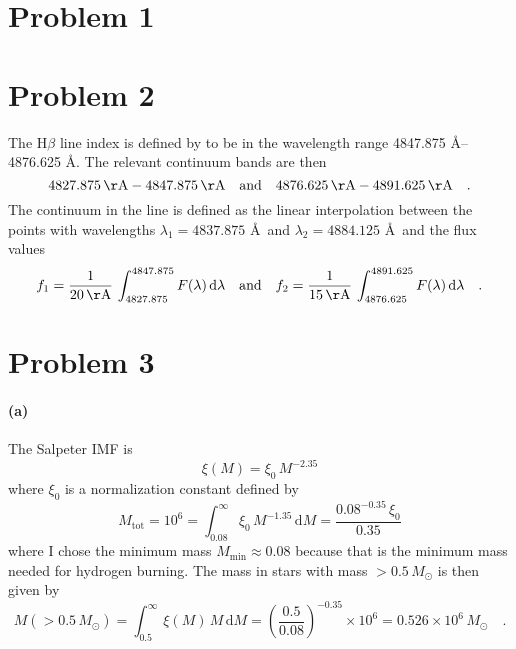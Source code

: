 \documentclass[11pt]{article}
\newcommand{\sun}{\odot}
\newcommand{\dd}{\ensuremath{\,\mathrm{d}}}
\begin{document}
\section*{Problem 1}

\section*{Problem 2}

The H$\beta$ line index is defined by \citet{worthey} to be in the wavelength
range 4847.875 \AA--4876.625 \AA. The relevant continuum bands are then
\begin{equation}
    4827.875 \, \mathrm{\AA}-4847.875\,\mathrm{\AA} \quad \mathrm{and} \quad
    4876.625 \, \mathrm{\AA}-4891.625\, \mathrm{\AA} \quad.
\end{equation}
The continuum in the line is defined as the linear interpolation between the
points with wavelengths $\lambda_1 = 4837.875$ \AA\ and $\lambda_2 = 4884.125$
\AA\ and the flux values
\begin{eqnarray}
    f_1 = \frac{1}{20 \, \mathrm{\AA}} \,
        \int_{4827.875} ^{4847.875} F(\lambda) \dd \lambda
    \quad \mathrm{and} \quad
    f_2 = \frac{1}{15 \, \mathrm{\AA}} \,
        \int_{4876.625} ^{4891.625} F(\lambda) \dd \lambda
    \quad.
\end{eqnarray}


\section*{Problem 3}

\paragraph{(a)}

The Salpeter IMF is
\begin{equation}
    \xi (M) = \xi_0 \, M^{-2.35}
\end{equation}
where $\xi_0$ is a normalization constant defined by
\begin{equation}
    M_\mathrm{tot} = 10^6 = \int_{0.08} ^{\infty} \xi_0 \, M^{-1.35} \dd M
        = \frac{0.08^{-0.35} \, \xi_0}{0.35}
\end{equation}
where I chose the minimum mass $M_\mathrm{min} \approx 0.08$ because that is
the minimum mass needed for hydrogen burning. The mass in stars with mass
$>0.5 \, M_\sun$ is then given by
\begin{equation}
    M (>0.5 \, M_\sun) = \int_{0.5} ^\infty \xi (M) \, M \dd M
        = \left ( \frac{0.5}{0.08} \right )^{-0.35} \times 10^6
        = 0.526 \times 10^6 \, M_\sun \quad.
\end{equation}
\end{document}
